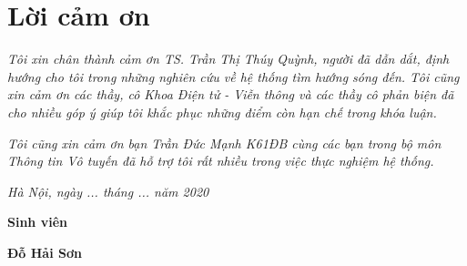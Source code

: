 \clearpage
{}

\chapter*{Lời cảm ơn}

\textit{Tôi xin chân thành cảm ơn TS. Trần Thị Thúy Quỳnh, người đã dẫn dắt, định hướng cho tôi trong những nghiên cứu về hệ thống tìm hướng sóng đến. Tôi cũng xin cảm ơn các thầy, cô Khoa Điện tử - Viễn thông và các thầy cô phản biện đã cho nhiều góp ý giúp tôi khắc phục những điểm còn hạn chế trong khóa luận.}

\textit{Tôi cũng xin cảm ơn bạn Trần Đức Mạnh K61ĐB cùng các bạn trong bộ môn Thông tin Vô tuyến đã hỗ trợ tôi rất nhiều trong việc thực nghiệm hệ thống.}

\vspace{1cm}
\hspace{7cm}\textit{Hà Nội, ngày ... tháng ... năm 2020}

\hspace{9.4cm}\textbf{Sinh viên}
\vspace{2.5cm}


\hspace{9.3cm}\textbf{Đỗ Hải Sơn}

